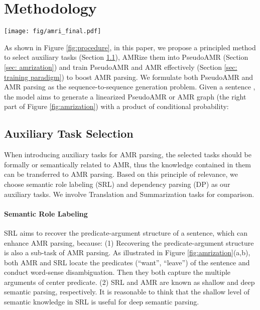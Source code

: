\documentclass[11pt]{article}
\begin{document}
 



\section{Methodology}
\begin{figure*}[t]
    \centering
    \texttt{[image: fig/amri\_final.pdf]}
    \caption{Illustration of AMRization methods and Graph Linearization. The source sentence is ``The boy wants to leave."}
    \label{fig:amrization}
\end{figure*}

As shown in Figure \ref{fig:procedure}, in this paper,  we propose a principled method to select auxiliary tasks (Section \ref{sec: task selection}), AMRize them into PseudoAMR (Section \ref{sec: amrization}) and train PseudoAMR and AMR effectively (Section \ref{sec: training paradigm}) to boost AMR parsing.
We formulate both PseudoAMR and AMR parsing as the sequence-to-sequence generation problem.
Given a sentence , the model aims to generate a linearized PseudoAMR or AMR graph  (the right part of Figure \ref{fig:amrization}) with a product of conditional probability:



\subsection{Auxiliary Task Selection}
\label{sec: task selection}
When introducing auxiliary tasks for AMR parsing, the selected tasks should be   formally or semantically related to AMR, thus the knowledge contained in them can be transferred to AMR parsing.
Based on this principle of relevance, we choose semantic role labeling (SRL) and dependency parsing (DP) as our auxiliary tasks. We involve Translation and Summarization tasks for comparison.

\paragraph{Semantic Role Labeling} 
SRL aims to recover the predicate-argument structure of a sentence, which can enhance AMR parsing, because:
(1) Recovering the predicate-argument structure is also a sub-task of AMR parsing. As illustrated in Figure \ref{fig:amrization}(a,b), both AMR and SRL locate the predicates (``want'', ``leave'') of the sentence and conduct word-sense disambiguation. Then they both capture the multiple arguments of center predicate. 
(2) SRL and AMR are known as shallow and deep semantic parsing, respectively.
It is reasonable to think that the shallow level of semantic knowledge in SRL is useful for deep semantic parsing.
\end{document}
